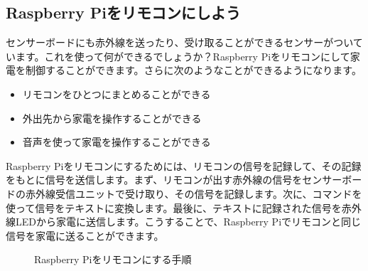 \subsection{Raspberry Piをリモコンにしよう}

センサーボードにも赤外線を送ったり、受け取ることができるセンサーがついています。これを使って何ができるでしょうか？Raspberry Piをリモコンにして家電を制御することができます。さらに次のようなことができるようになります。

\begin{itemize}
\item リモコンをひとつにまとめることができる
\item 外出先から家電を操作することができる
\item 音声を使って家電を操作することができる
\end{itemize}

Raspberry Piをリモコンにするためには、リモコンの信号を記録して、その記録をもとに信号を送信します。まず、リモコンが出す赤外線の信号をセンサーボードの赤外線受信ユニットで受け取り、その信号を記録します。次に、コマンドを使って信号をテキストに変換します。最後に、テキストに記録された信号を赤外線LEDから家電に送信します。こうすることで、Raspberry Piでリモコンと同じ信号を家電に送ることができます。

\begin{figure}[H]
    \centering
 
    \caption{Raspberry Piをリモコンにする手順}
\end{figure}

